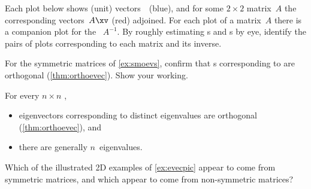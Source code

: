 \begin{exercise} \label{ex:} 
Each plot below shows (unit) vectors~\xv\ (blue), and for some \(2\times 2\) matrix~\(A\) the corresponding vectors~\(A\xv\) (red) adjoined. 
For each plot of a matrix~\(A\) there is a companion plot for the ~\(A^{-1}\).
By roughly estimating s and s by eye, identify the pairs of plots corresponding to each matrix and its inverse.
\begin{parts}
\item {}
\item {}
\item {}
\item {}
\item {}
\item {}
\item {}
\item {}
\item {}
\item {}
\end{parts}
\end{exercise}





\begin{exercise} \label{ex:} 
For the symmetric matrices of \autoref{ex:smoevs}, confirm that s corresponding to  are orthogonal (\autoref{thm:orthoevec}).  Show your working.
\end{exercise}






\begin{exercise} \label{ex:} 
For every \(n\times n\) ,
\begin{itemize}
\item  eigenvectors corresponding to distinct eigenvalues are orthogonal (\autoref{thm:orthoevec}), and
\item  there are generally \(n\)~eigenvalues.
\end{itemize}
Which of the illustrated 2D examples of \autoref{ex:evecpic} appear to come from symmetric matrices, and which appear to come from non-symmetric matrices?
\end{exercise}





